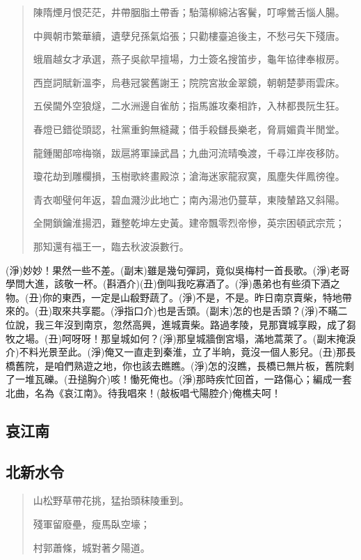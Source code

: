 \documentclass[UTF8]{ctexart}
\begin{document}
\begin{verse}

    陳隋煙月恨茫茫，井帶胭脂土帶香；駘蕩柳綿沾客鬢，叮嚀鶯舌惱人腸。
    
    中興朝市繁華續，遺孽兒孫氣焰張；只勸樓臺追後主，不愁弓矢下殘唐。
    
    蛾眉越女才承選，燕子吳歈早擅場，力士簽名搜笛步，龜年協律奉椒房。
    
    西崑詞賦新溫李，烏巷冠裳舊謝王；院院宮妝金翠鏡，朝朝楚夢雨雲床。
    
    五侯閫外空狼燧，二水洲邊自雀舫；指馬誰攻秦相詐，入林都畏阮生狂。
    
    春燈已錯從頭認，社黨重鉤無縫藏；借手殺讎長樂老，脅肩媚貴半閒堂。
    
    龍鍾閣部啼梅嶺，跋扈將軍譟武昌；九曲河流晴喚渡，千尋江岸夜移防。
    
    瓊花劫到雕欄損，玉樹歌終畫殿涼；滄海迷家龍寂寞，風塵失伴鳳徬徨。
    
    青衣啣璧何年返，碧血濺沙此地亡；南內湯池仍蔓草，東陵輦路又斜陽。
    
    全開鎖鑰淮揚泗，難整乾坤左史黃。建帝飄零烈帝慘，英宗困頓武宗荒；
    
    那知還有福王一，臨去秋波淚數行。

\end{verse}

(淨)妙妙！果然一些不差。(副末)雖是幾句彈詞，竟似吳梅村一首長歌。(淨)老哥學問大進，該敬一杯。(斟酒介)(丑)倒叫我吃寡酒了。(淨)愚弟也有些須下酒之物。(丑)你的東西，一定是山殽野蔬了。(淨)不是，不是。昨日南京賣柴，特地帶來的。(丑)取來共享罷。(淨指口介)也是舌頭。(副末)怎的也是舌頭？(淨)不瞞二位說，我三年沒到南京，忽然高興，進城賣柴。路過孝陵，見那寶城享殿，成了芻牧之場。(丑)呵呀呀！那皇城如何？(淨)那皇城牆倒宮塌，滿地蒿萊了。(副末掩淚介)不料光景至此。(淨)俺又一直走到秦淮，立了半晌，竟沒一個人影兒。(丑)那長橋舊院，是咱們熟遊之地，你也該去瞧瞧。(淨)怎的沒瞧，長橋已無片板，舊院剩了一堆瓦礫。(丑搥胸介)咳！慟死俺也。(淨)那時疾忙回首，一路傷心；編成一套北曲，名為《哀江南》。待我唱來！(敲板唱弋陽腔介)俺樵夫呵！

\subsection*{哀江南}

\subsection{北新水令}

\begin{verse}
    山松野草帶花挑，猛抬頭秣陵重到。
    
    殘軍留廢壘，瘦馬臥空壕；
    
    村郭蕭條，城對著夕陽道。
\end{verse}
\end{document}
